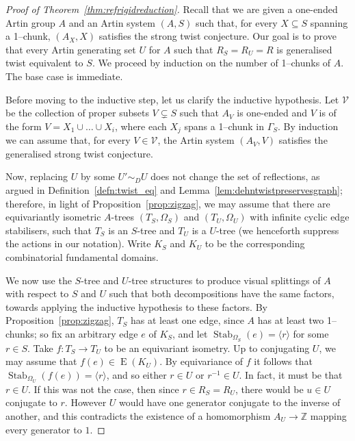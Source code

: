 \documentclass[svgnames]{amsart}
\theoremstyle{plain}
\theoremstyle{definition}
\newcommand{\Z}{\mathbb{Z}}
\newcommand{\edge}[1]{\operatorname{E}(#1)}
\newcommand{\Stab}[2]{\operatorname{Stab}_{#1}\left(#2\right)}
\begin{document}
\begin{proof}[Proof of Theorem~\ref{thm:refrigidreduction}] Recall that we are given a one-ended Artin group $A$ and an Artin system $(A,S)$ such that, for every $X\subseteq S$ spanning a 1--chunk, $(A_X,X)$ satisfies the strong twist conjecture. Our goal is to prove that every Artin generating set $U$ for $A$ such that $R_S=R_U=R$ is generalised twist equivalent to $S$. We proceed by induction on the number of 1--chunks of $A$. The base case is immediate.

Before moving to the inductive step, let us clarify the inductive hypothesis. Let $\mathcal V$ be the collection of proper subsets $V\subsetneq S$ such that $A_V$ is one-ended and $V$ is of the form $V=X_1\cup\ldots\cup X_i$, where each $X_j$ spans a 1--chunk in $\Gamma_S$. By induction we can assume that, for every $V\in \mathcal V$, the Artin system $(A_V,V)$ satisfies the generalised strong twist conjecture.


Now, replacing $U$ by some $U'\sim_D U$ does not change the set of reflections, as argued in Definition~\ref{defn:twist_eq} and Lemma~\ref{lem:dehntwistpreservesgraph};  therefore, in light of Proposition~\ref{prop:zigzag}, we may assume that there are equivariantly isometric $A$-trees $(T_S, \Omega_S)$ and $(T_U, \Omega_U)$  with infinite cyclic edge stabilisers, such that $T_S$ is an $S$-tree and $T_U$ is a $U$-tree (we henceforth suppress the actions in our notation). Write $K_S$ and $K_U$ to be the corresponding combinatorial fundamental domains.

\par\medskip
    We now use the $S$-tree and $U$-tree structures to produce visual splittings of $A$ with respect to $S$ and $U$ such that both decompositions have the same factors, towards applying the inductive hypothesis to these factors. By Proposition~\ref{prop:zigzag}, $T_S$ has at least one edge, since $A$ has at least two 1--chunks; so fix an arbitrary edge $e$ of $K_S$, and let $\Stab{\Omega_S}{e} = \langle r \rangle$ for some $r \in S$. Take $f: T_S \rightarrow T_U$ to be an equivariant isometry. Up to conjugating $U$, we may assume that $f(e) \in \edge{K_U}$. By equivariance of $f$ it follows that $\Stab{\Omega_U}{f(e)} = \langle r \rangle$, and so either $r \in U$ or $r^{-1} \in U$. In fact, it must be that $r \in U$. If this was not the case, then since $r \in R_S = R_U$, there would be $u \in U$ conjugate to $r$. However $U$ would have one generator conjugate to the inverse of another, and this contradicts the existence of a homomorphism $A_U\to \Z$ mapping every generator to $1$.


\end{proof}
\end{document}

